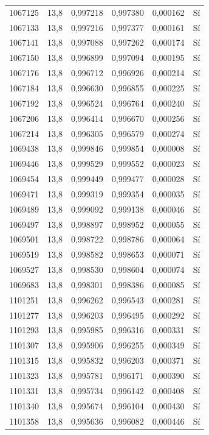 \begin{longtable}{lccccc}
1067125 & 13,8 & 0,997218 & 0,997380 & 0,000162 & Sí \\
1067133 & 13,8 & 0,997216 & 0,997377 & 0,000161 & Sí \\
1067141 & 13,8 & 0,997088 & 0,997262 & 0,000174 & Sí \\
1067150 & 13,8 & 0,996899 & 0,997094 & 0,000195 & Sí \\
1067176 & 13,8 & 0,996712 & 0,996926 & 0,000214 & Sí \\
1067184 & 13,8 & 0,996630 & 0,996855 & 0,000225 & Sí \\
1067192 & 13,8 & 0,996524 & 0,996764 & 0,000240 & Sí \\
1067206 & 13,8 & 0,996414 & 0,996670 & 0,000256 & Sí \\
1067214 & 13,8 & 0,996305 & 0,996579 & 0,000274 & Sí \\
1069438 & 13,8 & 0,999846 & 0,999854 & 0,000008 & Sí \\
1069446 & 13,8 & 0,999529 & 0,999552 & 0,000023 & Sí \\
1069454 & 13,8 & 0,999449 & 0,999477 & 0,000028 & Sí \\
1069471 & 13,8 & 0,999319 & 0,999354 & 0,000035 & Sí \\
1069489 & 13,8 & 0,999092 & 0,999138 & 0,000046 & Sí \\
1069497 & 13,8 & 0,998897 & 0,998952 & 0,000055 & Sí \\
1069501 & 13,8 & 0,998722 & 0,998786 & 0,000064 & Sí \\
1069519 & 13,8 & 0,998582 & 0,998653 & 0,000071 & Sí \\
1069527 & 13,8 & 0,998530 & 0,998604 & 0,000074 & Sí \\
1069683 & 13,8 & 0,998301 & 0,998386 & 0,000085 & Sí \\
1101251 & 13,8 & 0,996262 & 0,996543 & 0,000281 & Sí \\
1101277 & 13,8 & 0,996203 & 0,996495 & 0,000292 & Sí \\
1101293 & 13,8 & 0,995985 & 0,996316 & 0,000331 & Sí \\
1101307 & 13,8 & 0,995906 & 0,996255 & 0,000349 & Sí \\
1101315 & 13,8 & 0,995832 & 0,996203 & 0,000371 & Sí \\
1101323 & 13,8 & 0,995781 & 0,996171 & 0,000390 & Sí \\
1101331 & 13,8 & 0,995734 & 0,996142 & 0,000408 & Sí \\
1101340 & 13,8 & 0,995674 & 0,996104 & 0,000430 & Sí \\
1101358 & 13,8 & 0,995636 & 0,996082 & 0,000446 & Sí \\

\end{longtable}
